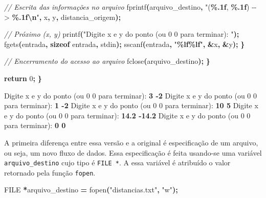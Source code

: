\documentclass[
  11pt,
  a4paper,
]{scrbook}
\newenvironment{Shaded}{\begin{snugshade}}{\end{snugshade}}
\newcommand{\CommentTok}[1]{\textcolor[rgb]{0.56,0.35,0.01}{\textit{#1}}}
\newcommand{\ControlFlowTok}[1]{\textcolor[rgb]{0.13,0.29,0.53}{\textbf{#1}}}
\newcommand{\DataTypeTok}[1]{\textcolor[rgb]{0.13,0.29,0.53}{#1}}
\newcommand{\DecValTok}[1]{\textcolor[rgb]{0.00,0.00,0.81}{#1}}
\newcommand{\KeywordTok}[1]{\textcolor[rgb]{0.13,0.29,0.53}{\textbf{#1}}}
\newcommand{\NormalTok}[1]{#1}
\newcommand{\OperatorTok}[1]{\textcolor[rgb]{0.81,0.36,0.00}{\textbf{#1}}}
\newcommand{\SpecialCharTok}[1]{\textcolor[rgb]{0.81,0.36,0.00}{\textbf{#1}}}
\newcommand{\StringTok}[1]{\textcolor[rgb]{0.31,0.60,0.02}{#1}}
\begin{document}
\begin{Shaded}
\begin{Highlighting}[numbers=left,,]
            \CommentTok{// Escrita das informações no arquivo}
\NormalTok{            fprintf}\OperatorTok{(}\NormalTok{arquivo\_destino}\OperatorTok{,} \StringTok{"(}\SpecialCharTok{\%.1f}\StringTok{, }\SpecialCharTok{\%.1f}\StringTok{) {-}{-}\textgreater{} }\SpecialCharTok{\%.1f\textbackslash{}n}\StringTok{"}\OperatorTok{,}\NormalTok{ x}\OperatorTok{,}\NormalTok{ y}\OperatorTok{,}\NormalTok{ distancia\_origem}\OperatorTok{);}

            \CommentTok{// Próximo (x, y)}
\NormalTok{            printf}\OperatorTok{(}\StringTok{"Digite x e y do ponto (ou 0 0  para terminar): "}\OperatorTok{);}
\NormalTok{            fgets}\OperatorTok{(}\NormalTok{entrada}\OperatorTok{,} \KeywordTok{sizeof}\NormalTok{ entrada}\OperatorTok{,}\NormalTok{ stdin}\OperatorTok{);}
\NormalTok{            sscanf}\OperatorTok{(}\NormalTok{entrada}\OperatorTok{,} \StringTok{"}\SpecialCharTok{\%lf\%lf}\StringTok{"}\OperatorTok{,} \OperatorTok{\&}\NormalTok{x}\OperatorTok{,} \OperatorTok{\&}\NormalTok{y}\OperatorTok{);}
        \OperatorTok{\}}

        \CommentTok{// Encerramento do acesso ao arquivo}
\NormalTok{        fclose}\OperatorTok{(}\NormalTok{arquivo\_destino}\OperatorTok{);}
    \OperatorTok{\}}

    \ControlFlowTok{return} \DecValTok{0}\OperatorTok{;}
\OperatorTok{\}}
\end{Highlighting}
\end{Shaded}

\begin{Shaded}
\begin{Highlighting}[]
\NormalTok{Digite x e y do ponto (ou 0 0  para terminar): }\KeywordTok{ 3 {-}2 }
\NormalTok{Digite x e y do ponto (ou 0 0  para terminar): }\KeywordTok{ 1 {-}2 }
\NormalTok{Digite x e y do ponto (ou 0 0  para terminar): }\KeywordTok{ 10 5 }
\NormalTok{Digite x e y do ponto (ou 0 0  para terminar): }\KeywordTok{ 14.2 {-}14.2 }
\NormalTok{Digite x e y do ponto (ou 0 0  para terminar): }\KeywordTok{ 0 0 }
\end{Highlighting}
\end{Shaded}

A primeira diferença entre essa versão e a original é especificação de
um arquivo, ou seja, um novo fluxo de dados. Essa especificação é feita
usando-se uma variável \texttt{arquivo\_destino} cujo tipo é
\texttt{FILE\ *}. A essa variável é atribuído o valor retornado pela
função \texttt{fopen}.

\begin{Shaded}
\begin{Highlighting}[]
\DataTypeTok{FILE} \OperatorTok{*}\NormalTok{arquivo\_destino }\OperatorTok{=}\NormalTok{ fopen}\OperatorTok{(}\StringTok{"distancias.txt"}\OperatorTok{,} \StringTok{"w"}\OperatorTok{);}
\end{Highlighting}
\end{Shaded}
\end{document}
